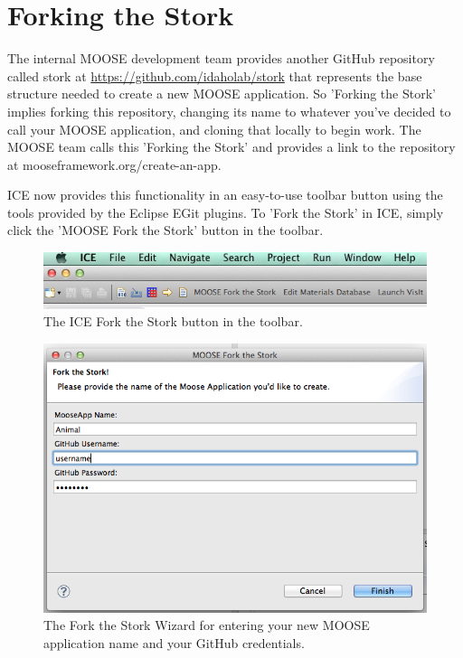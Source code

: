 \section{Forking the Stork}\label{forking-the-stork}

The internal MOOSE development team provides another GitHub repository
called stork at \url{https://github.com/idaholab/stork} that represents
the base structure needed to create a new MOOSE application. So 'Forking
the Stork' implies forking this repository, changing its name to
whatever you've decided to call your MOOSE application, and cloning that
locally to begin work. The MOOSE team calls this 'Forking the Stork' and
provides a link to the repository at mooseframework.org/create-an-app.

ICE now provides this functionality in an easy-to-use toolbar button
using the tools provided by the Eclipse EGit plugins. To 'Fork the
Stork' in ICE, simply click the 'MOOSE Fork the Stork' button in the
toolbar.

\begin{figure}[htbp]
\centering
\includegraphics[width=\textwidth]{figures/fork_button.png}
\caption{The ICE Fork the Stork button in the toolbar. }
\end{figure}
\begin{figure}[htbp]
\centering
\includegraphics[width=\textwidth]{figures/fork_dialog.png}
\caption{The Fork the Stork Wizard for entering your new MOOSE application name and your GitHub credentials.}
\end{figure}

